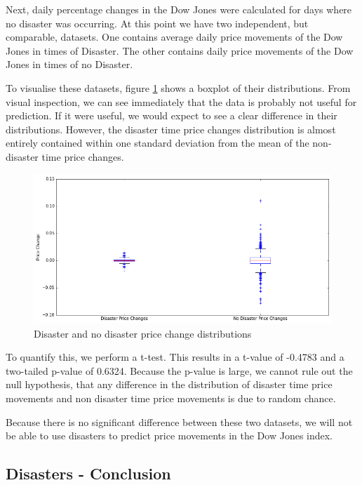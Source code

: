 \documentclass{report}
\begin{document}
Next, daily percentage changes in the Dow Jones were calculated for days where no disaster was occurring. At this point we have two independent, but comparable, datasets. One contains average daily price movements of the Dow Jones in times of Disaster. The other contains daily price movements of the Dow Jones in times of no Disaster. 

To visualise these datasets, figure \ref{fig:disaster-box} shows a boxplot of their distributions. From visual inspection, we can see immediately that the data is probably not useful for prediction. If it were useful, we would expect to see a clear difference in their distributions. However, the disaster time price changes distribution is almost entirely contained within one standard deviation from the mean of the non-disaster time price changes.

\begin{figure}[H]
	\caption{Disaster and no disaster price change distributions}
	\centerline{\includegraphics[width=\textwidth]{vis/disaster_box.png}}
	\label{fig:disaster-box}
\end{figure}

To quantify this, we perform a t-test. This results in a t-value of -0.4783 and a two-tailed p-value of 0.6324. Because the p-value is large, we cannot rule out the null hypothesis, that any difference in the distribution of disaster time price movements and non disaster time price movements is due to random chance.

Because there is no significant difference between these two datasets, we will not be able to use disasters to predict price movements in the Dow Jones index.

\subsection{Disasters - Conclusion}
\end{document}
